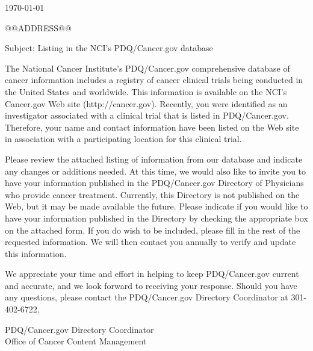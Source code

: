 \documentclass[letterpaper,12pt]{letter}
\begin{document}
\thispagestyle{empty}

\LetterheadWithLogo
  
\vspace{20pt}

\today

@@ADDRESS@@


Subject: Listing in the NCI's PDQ/Cancer.gov database

\raggedright
The National Cancer Institute's PDQ/Cancer.gov comprehensive database of
cancer information includes a registry of cancer clinical trials being
conducted in the United States and worldwide.  This information is
available on the NCI's Cancer.gov Web site (http://cancer.gov). 
Recently, you were identified as an investigator associated with a
clinical trial that is listed in PDQ/Cancer.gov.  Therefore, your name
and contact information have been listed on the Web site in association
with a participating location for this clinical trial.

Please review the attached listing of information from our database and
indicate any changes or additions needed.  At this time, we would also
like to invite you to have your information published in the
PDQ/Cancer.gov Directory of Physicians who provide cancer treatment. 
Currently, this Directory is not published on the Web, but it may be
made available the future.  Please indicate if you would like to have
your information published in the Directory by checking the appropriate
box on the attached form.  If you do wish to be included, please fill in
the rest of the requested information.  We will then contact you
annually to verify and update this information.

We appreciate your time and effort in helping to keep PDQ/Cancer.gov
current and accurate, and we look forward to receiving your response. 
Should you have any questions, please contact the PDQ/Cancer.gov
Directory Coordinator at 301-402-6722.

\vspace{12pt}

PDQ/Cancer.gov Directory Coordinator \\
Office of Cancer Content Management

\vfill
\end{document}
